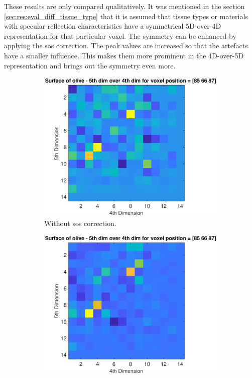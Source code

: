 These results are only compared qualitatively. It was mentioned in the section \ref{sec:res:eval_diff_tissue_type} that it is assumed that tissue types or materials with specular reflection characteristics have a symmetrical 5D-over-4D representation for that particular voxel. The symmetry can be enhanced by applying the \ac{sos} correction. The peak values are increased so that the artefacts have a smaller influence. This makes them more prominent in the 4D-over-5D representation and brings out the symmetry even more. 

\begin{figure}[H]
     \centering
      \hfill
     \begin{subfigure}[b]{0.45\textwidth}
         \centering
         \includegraphics[width=1.02\textwidth,right]{Graphics/Results/14_vecs_sos_vs_noSos/5thdim_over4D_no_sos_stone.eps}
         \caption{Without \ac{sos} correction.}
         \label{fig:influence_sos_2_a}
     \end{subfigure}
          \hfill
     \begin{subfigure}[b]{0.47\textwidth}
         \centering
         \includegraphics[width=1.02\textwidth]{Graphics/Results/14_vecs_sos_vs_noSos/5thdim_over4D_with_sos_stone.eps}

\end{subfigure}
\end{figure}
